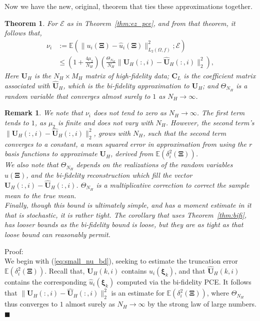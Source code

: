 \documentclass{report}
\newtheorem{thm}{Theorem}[section]
\newtheorem{remark}{Remark}[section]
\begin{document}
Now we have the new, original, theorem that ties these approximations together.
\begin{thm}
\label{thm:new_pc}
For $\mathcal{E}$  as in Theorem~\ref{thm:ez_pce}, and from that theorem, it follows that,
\begin{align}
\label{eq:large_nu_bd}
 \nu_i& := \mathbb{E}\left(\|u_i(\bm{\Xi})-\hat{u}_i(\bm{\Xi})\|^2_{L_2(\Omega,f)};\mathcal{E}\right)\\
 \label{eq:large_nu_bd2}
      &\le \left(1+\frac{4\mu_2}{N_H}\right)\left(\frac{\Theta_{N_H}}{N_H}\|\bm{U}_H(:,i)-\hat{\bm{U}}_H(:,i)\|^2_2\right),
\end{align}
Here $\bm{U}_H$ is the $N_H\times M_H$ matrix of high-fidelity data; $\bm{C}_L$ is the coefficient matrix associated with $\hat{\bm{U}}_H$, which is the bi-fidelity approximation to $\bm{U}_H$; and $\Theta_{N_H}$ is a random variable that converges almost surely to $1$ as $N_H\rightarrow\infty$.
\end{thm}
\begin{remark}
 We note that $\nu_i$ does not tend to zero as $N_H\rightarrow \infty$. The first term tends to $1$, as $\mu_2$ is finite and does not vary with $N_H$. However, the second term's $\|\bm{U}_H(:,i) - \hat{\bm{U}}_H(:,i)\|^2_2$, grows with $N_H$, such that the second term converges to a constant, a mean squared error in approximation from using the $r$ basis functions to approximate $\bm{U}_H$, derived from $\mathbb{E}(\delta^2_i(\bm{\Xi}))$.\\
 
 We also note that $\Theta_{N_H}$ depends on the realizations of the random variables $u(\bm{\Xi})$, and the bi-fidelity reconstruction which fill the vector $\bm{U}_H(:,i)-\hat{\bm{U}}_H(:,i)$. $\Theta_{N_H}$ is a multiplicative correction to correct the sample mean to the true mean.\\
 
 Finally, though this bound is ultimately simple, and has a moment estimate in it that is stochastic, it is rather tight. The corollary that uses Theorem~\ref{thm:bifi}, has looser bounds as the bi-fidelity bound is loose, but they are as tight as that loose bound can reasonably permit.
\end{remark}

Proof:\\
We begin with (\ref{eq:small_nu_bd}), seeking to estimate the truncation error $\mathbb{E}(\delta^2_i(\bm{\Xi}))$. Recall that, $\bm{U}_H(k,i)$ contains $u_i(\bm{\xi}_k)$, and that $\hat{\bm{U}}_H(k,i)$ contains the corresponding $\hat{u}_i(\bm{\xi}_k)$ computed via the bi-fidelity PCE. It follows that $\|\bm{U}_H(:,i)-\hat{\bm{U}}_H(:,i)\|_2^2$ is an estimate for $\mathbb{E}(\delta^2_i(\bm{\Xi}))$, where $\Theta_{N_H}$ thus converges to $1$ almost surely as $N_H\rightarrow\infty$ by the strong law of large numbers. $\blacksquare$\\
\end{document}
